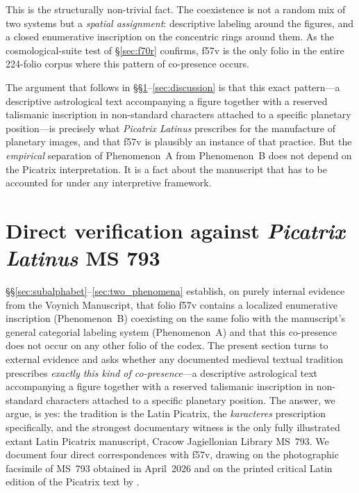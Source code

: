 This is the structurally non-trivial fact. The coexistence is not a
random mix of two systems but a \emph{spatial assignment}: descriptive
labeling around the figures, and a closed enumerative inscription on
the concentric rings around them. As the cosmological-suite test of
\S\ref{sec:f70r} confirms, f57v is the only folio in the entire
224-folio corpus where this pattern of co-presence occurs.

The argument that follows in
\S\S\ref{sec:verification}--\ref{sec:discussion} is that this exact
pattern---a descriptive astrological text accompanying a figure together
with a reserved talismanic inscription in non-standard characters
attached to a specific planetary position---is precisely what
\textit{Picatrix Latinus} prescribes for the manufacture of planetary
images, and that f57v is plausibly an instance of that practice. But the
\emph{empirical} separation of Phenomenon~A from Phenomenon~B does not
depend on the Picatrix interpretation. It is a fact about the manuscript
that has to be accounted for under any interpretive framework.


\section{Direct verification against \textit{Picatrix Latinus} MS 793}
\label{sec:verification}

\S\S\ref{sec:subalphabet}--\ref{sec:two_phenomena} establish, on purely
internal evidence from the Voynich Manuscript, that folio f57v contains a
localized enumerative inscription (Phenomenon~B) coexisting on the same
folio with the manuscript's general categorial labeling system
(Phenomenon~A) and that this co-presence does not occur on any other folio
of the codex. The present section turns to external evidence and asks
whether any documented medieval textual tradition prescribes \emph{exactly
this kind of co-presence}---a descriptive astrological text accompanying a
figure together with a reserved talismanic inscription in non-standard
characters attached to a specific planetary position. The answer, we
argue, is yes: the tradition is the Latin Picatrix, the
\textit{karacteres} prescription specifically, and the strongest documentary
witness is the only fully illustrated extant Latin Picatrix manuscript,
Cracow Jagiellonian Library MS~793. We document four direct
correspondences with f57v, drawing on the photographic facsimile of MS~793
obtained in April~2026 and on the printed critical Latin edition of the
Picatrix text by \citet{pingree1986}.


